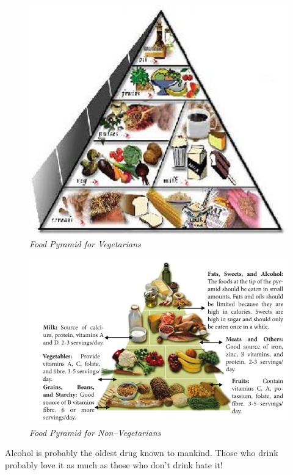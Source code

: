 \begin{figure}
\caption{\textit{Food Pyramid for Vegetarians}}
\includegraphics{images/082.jpg}
\end{figure}


\begin{figure}
\caption{\textit{Food Pyramid for Non–Vegetarians}}
\includegraphics{images/083.jpg}
\end{figure}


Alcohol is probably the oldest drug known to mankind. Those who drink probably love it as much as those who don’t drink hate it!

